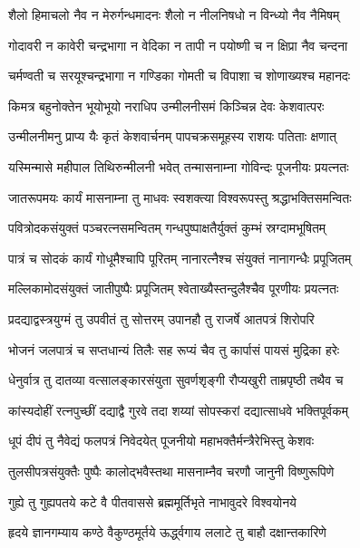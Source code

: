 \twolineshloka
{शैलो हिमाचलो नैव न मेरुर्गन्धमादनः}
{शैलो न नीलनिषधो न विन्ध्यो नैव नैमिषम्}%

\twolineshloka
{गोदावरी न कावेरी चन्द्रभागा न वेदिका}
{न तापी न पयोष्णी च न क्षिप्रा नैव चन्दना}%

\twolineshloka
{चर्मण्वती च सरयूश्चन्द्रभागा न गण्डिका}
{गोमती च विपाशा च शोणाख्यश्च महानदः}%

\twolineshloka
{किमत्र बहुनोक्तेन भूयोभूयो नराधिप}
{उन्मीलनीसमं किञ्चिन्न देवः केशवात्परः}%

\twolineshloka
{उन्मीलनीमनु प्राप्य यैः कृतं केशवार्चनम्}
{पापचक्रसमूहस्य राशयः पतिताः क्षणात्}%

\twolineshloka
{यस्मिन्मासे महीपाल तिथिरुन्मीलनी भवेत्}
{तन्मासनाम्ना गोविन्दः पूजनीयः प्रयत्नतः}%

\twolineshloka
{जातरूपमयः कार्यं मासनाम्ना तु माधवः}
{स्वशक्त्या विश्वरूपस्तु श्रद्धाभक्तिसमन्वितः}%

\twolineshloka
{पवित्रोदकसंयुक्तं पञ्चरत्नसमन्वितम्}
{गन्धपुष्पाक्षतैर्युक्तं कुम्भं स्रग्दामभूषितम्}%

\twolineshloka
{पात्रं च सोदकं कार्यं गोधूमैश्चापि पूरितम्}
{नानारत्नैश्च संयुक्तं नानागन्धैः प्रपूजितम्}%

\twolineshloka
{मल्लिकामोदसंयुक्तं जातीपुष्पैः प्रपूजितम्}
{श्वेताख्यैस्तन्दुलैश्चैव पूरणीयः प्रयत्नतः}%

\twolineshloka
{प्रदद्याद्वस्त्रयुग्मं तु उपवीतं तु सोत्तरम्}
{उपानहौ तु राजर्षे आतपत्रं शिरोपरि}%

\twolineshloka
{भोजनं जलपात्रं च सप्तधान्यं तिलैः सह}
{रूप्यं चैव तु कार्पासं पायसं मुद्रिका हरेः}%

\twolineshloka
{धेनुर्वात्र तु दातव्या वत्सालङ्कारसंयुता}
{सुवर्णशृङ्गी रौप्यखुरी ताम्रपृष्ठी तथैव च}%

\twolineshloka
{कांस्यदोहीं रत्नपुच्छीं दद्याद्वै गुरवे तदा}
{शय्यां सोपस्करां दद्यात्साधवे भक्तिपूर्वकम्}%

\twolineshloka
{धूपं दीपं तु नैवेद्यं फलपत्रं निवेदयेत्}
{पूजनीयो महाभक्तैर्मन्त्रैरेभिस्तु केशवः}%

\twolineshloka
{तुलसीपत्रसंयुक्तैः पुष्पैः कालोद्भवैस्तथा}
{मासनाम्नैव चरणौ जानुनी विष्णुरूपिणे}%

\twolineshloka
{गुह्ये तु गुह्यपतये कटे वै पीतवाससे}
{ब्रह्ममूर्तिभृते नाभावुदरे विश्वयोनये}%

\twolineshloka
{हृदये ज्ञानगम्याय कण्ठे वैकुण्ठमूर्तये}
{ऊर्द्ध्वगाय ललाटे तु बाहौ दक्षान्तकारिणे}%

